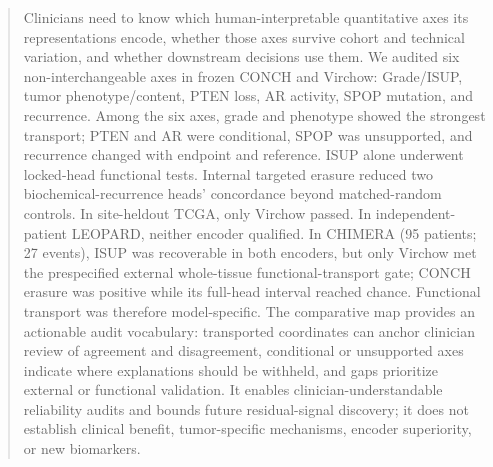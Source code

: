 \begin{abstract}
Clinicians need to know which human-interpretable
quantitative axes its representations encode, whether those axes survive cohort and technical
variation, and whether downstream decisions use them. We audited six non-interchangeable axes
in frozen CONCH and Virchow: Grade/ISUP, tumor phenotype/content, PTEN loss, AR
activity, SPOP mutation, and recurrence. Among the six axes, grade and phenotype showed the strongest transport;
PTEN and AR were conditional, SPOP was unsupported, and recurrence changed
with endpoint and reference. ISUP alone underwent locked-head functional tests. Internal targeted
erasure reduced two biochemical-recurrence heads' concordance beyond matched-random controls. In
site-heldout TCGA, only Virchow passed. In independent-patient LEOPARD, neither encoder qualified.
In CHIMERA (95 patients; 27 events), ISUP was recoverable in both encoders,
but only Virchow met the prespecified external whole-tissue functional-transport gate; CONCH
erasure was positive while its full-head interval reached chance. Functional transport was
therefore model-specific. The comparative map provides an actionable
audit vocabulary: transported coordinates can anchor clinician review of agreement and
disagreement, conditional or unsupported axes indicate where explanations should be withheld,
and gaps prioritize external or functional validation. It enables
clinician-understandable reliability audits and bounds future residual-signal discovery; it does not
establish clinical benefit, tumor-specific mechanisms, encoder superiority, or new biomarkers.
\end{abstract}
